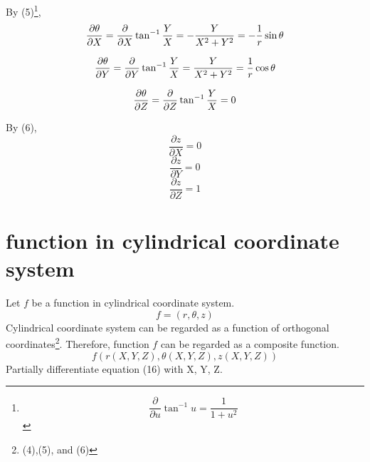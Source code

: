 \documentclass[a4j,10pt]{jsarticle}
\begin{document}
By (5)\footnote{$$\frac{\partial }{\partial u} \tan ^ {-1} u = \frac{1}{1+u^2} $$}, 
\begin{equation}
\frac{\partial \theta}{\partial X} = \frac{\partial}{\partial X} \tan ^ {-1} \frac{Y}{X} \\
= -\frac{Y}{X^2 + Y^2}\\
= - \frac{1}{r}\sin\theta
\end{equation}

\begin{equation}
\frac{\partial \theta}{\partial Y} = \frac{\partial}{\partial Y} \tan ^ {-1} \frac{Y}{X} \\
= \frac{Y}{X^2 + Y^2}\\
= \frac{1}{r}\cos \theta
\end{equation}

\begin{equation}
\frac{\partial \theta}{\partial Z} = \frac{\partial}{\partial Z} \tan ^ {-1} \frac{Y}{X} \\
= 0
\end{equation}

By (6), 
\begin{equation}
\frac{\partial z}{\partial X}  = 0
\end{equation}
\begin{equation}
\frac{\partial z}{\partial Y}  = 0
\end{equation}
\begin{equation}
\frac{\partial z}{\partial Z}  = 1
\end{equation}

\section{function in cylindrical coordinate system}
Let $f$ be a function in cylindrical coordinate system.
$$f = (r, \theta,  z)$$
Cylindrical coordinate system can be regarded as a function of orthogonal coordinates\footnote{(4),(5), and (6)}. Therefore, function $f$ can be regarded as a composite function.
\begin{equation}
f(r(X, Y, Z), \theta(X, Y, Z), z(X, Y, Z))
\end{equation}
Partially differentiate equation (16) with X, Y, Z. 
\end{document}
